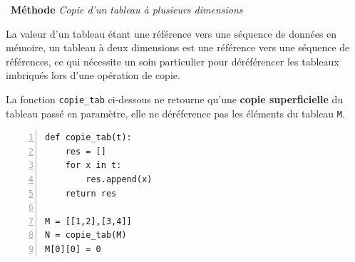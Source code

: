 \documentclass[a4paper, french, 12pt]{article}
\newcounter{def}
\newenvironment{methode}[1]
{\par \medskip    \noindent  
 \begin {bclogo}[arrondi =0.1,logo=\bcoutil, marge=4,noborder = true] {~\textbf{Méthode}   {\itshape #1} }  \par}
{
\end{bclogo}
 \par \bigskip }
\begin{document}
\vspace*{-20pt}

\begin{methode}{Copie d'un tableau à plusieurs dimensions}

La valeur d'un tableau étant une référence vers une séquence de données en mémoire, un tableau à deux dimensions est une référence vers une séquence de références, ce qui nécessite un soin particulier pour déréférencer les tableaux imbriqués lors d'une  opération de copie. 

La fonction \texttt{copie\_tab} ci-dessous ne retourne qu'une \textbf{copie superficielle} du tableau passé en paramètre, elle ne déréference pas les éléments du tableau \texttt{M}.


\begin{lstlisting}[style=compil, numbers=left] 
def copie_tab(t):
    res = []
    for x in t:
        res.append(x)
    return res

M = [[1,2],[3,4]]
N = copie_tab(M)
M[0][0] = 0
\end{lstlisting}


\end{methode}
\end{document}
